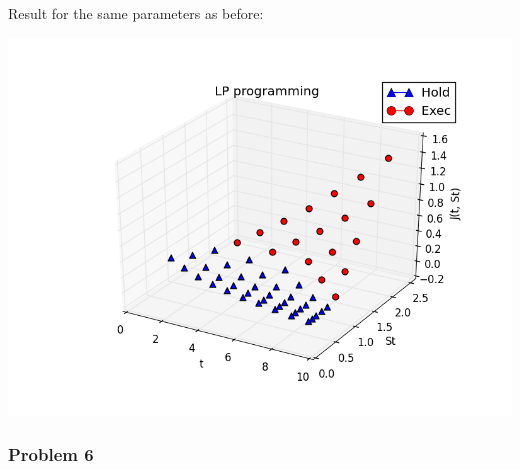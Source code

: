 \documentclass[12pt]{article}
\newcommand{\Q}[1]{\subsubsection*{Problem #1}}
\begin{document}
\begin{enumerate}
  Result for the same parameters as before:
  
  \includegraphics[scale=1.]{qlp.png}  
\end{enumerate}

\Q{6}
\end{document}
